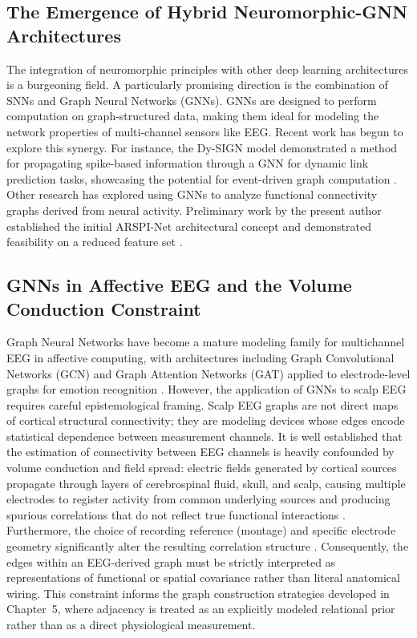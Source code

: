\subsection{The Emergence of Hybrid Neuromorphic-GNN Architectures}
The integration of neuromorphic principles with other deep learning architectures is a burgeoning field. A particularly promising direction is the combination of SNNs and Graph Neural Networks (GNNs). GNNs are designed to perform computation on graph-structured data, making them ideal for modeling the network properties of multi-channel sensors like EEG. Recent work has begun to explore this synergy. For instance, the Dy-SIGN model demonstrated a method for propagating spike-based information through a GNN for dynamic link prediction tasks, showcasing the potential for event-driven graph computation \cite{Yoon2024DySIGN}. Other research has explored using GNNs to analyze functional connectivity graphs derived from neural activity. Preliminary work by the present author established the initial ARSPI-Net architectural concept and demonstrated feasibility on a reduced feature set \cite{lane_arspi_2024}.

\subsection{GNNs in Affective EEG and the Volume Conduction Constraint}
\label{sec:volume_conduction}
Graph Neural Networks have become a mature modeling family for multichannel EEG in affective computing, with architectures including Graph Convolutional Networks (GCN) and Graph Attention Networks (GAT) applied to electrode-level graphs for emotion recognition \cite{Jia2024GNNEEGSentiment}. However, the application of GNNs to scalp EEG requires careful epistemological framing. Scalp EEG graphs are not direct maps of cortical structural connectivity; they are modeling devices whose edges encode statistical dependence between measurement channels. It is well established that the estimation of connectivity between EEG channels is heavily confounded by volume conduction and field spread: electric fields generated by cortical sources propagate through layers of cerebrospinal fluid, skull, and scalp, causing multiple electrodes to register activity from common underlying sources and producing spurious correlations that do not reflect true functional interactions \cite{nunez_srinivasan_2006}. Furthermore, the choice of recording reference (montage) and specific electrode geometry significantly alter the resulting correlation structure \cite{yao_2001}. Consequently, the edges within an EEG-derived graph must be strictly interpreted as representations of functional or spatial covariance rather than literal anatomical wiring. This constraint informs the graph construction strategies developed in Chapter~5, where adjacency is treated as an explicitly modeled relational prior rather than as a direct physiological measurement.

